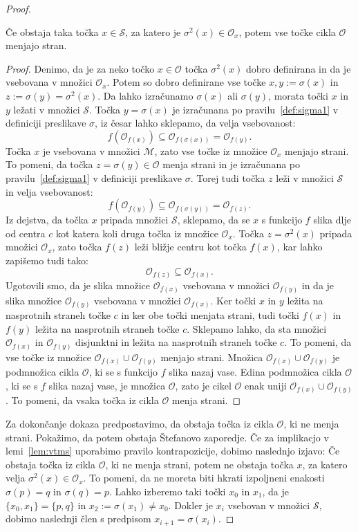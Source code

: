 \documentclass[mat2]{fmfdelo}
\begin{document}
\begin{proof}
\begin{lema}\label{lem:vtms}
Če obstaja taka točka $x \in \mathcal{S}$, za katero je $\sigma^2(x) \in \mathcal{O}_x$, potem vse točke cikla $\mathcal{O}$ menjajo stran.
\end{lema}
\begin{proof}
Denimo, da je za neko točko $x \in \mathcal{O}$ točka $\sigma^2(x)$ dobro definirana in da je vsebovana v množici $\mathcal{O}_x$. Potem so dobro definirane vse točke $x, y:=\sigma(x)$ in $z:=\sigma(y) = \sigma^2(x)$. Da lahko izračunamo $\sigma(x)$ ali $\sigma(y)$, morata točki $x$ in $y$ ležati v množici $\mathcal{S}$. Točka $y=\sigma(x)$ je izračunana po pravilu~\ref{def:sigma1} v definiciji preslikave $\sigma$, iz česar lahko sklepamo, da velja vsebovanost:
$$f(\mathcal{O}_{f(x)}) \subseteq \mathcal{O}_{f(\sigma(x))}=\mathcal{O}_{f(y)}.$$
Točka $x$ je vsebovana v množici $\mathcal{M}$, zato vse točke iz množice $\mathcal{O}_x$ menjajo strani. To pomeni, da točka $z = \sigma(y) \in \mathcal{O}$ menja strani in je izračunana po pravilu~\ref{def:sigma1} v definiciji preslikave $\sigma$. Torej tudi točka $z$ leži v množici $\mathcal{S}$ in velja vsebovanost:
$$f(\mathcal{O}_{f(y)}) \subseteq \mathcal{O}_{f(\sigma(y))}=\mathcal{O}_{f(z)}.$$
Iz dejstva, da točka $x$ pripada množici $\mathcal{S}$, sklepamo, da se $x$ s funkcijo $f$ slika dlje od centra $c$ kot katera koli druga točka iz množice $\mathcal{O}_x$. Točka $z=\sigma^2(x)$ pripada množici $\mathcal{O}_x$, zato točka $f(z)$ leži bližje centru kot točka $f(x)$, kar lahko zapišemo tudi tako:
$$\mathcal{O}_{f(z)} \subseteq \mathcal{O}_{f(x)}.$$
Ugotovili smo, da je slika množice $\mathcal{O}_{f(x)}$ vsebovana v množici $\mathcal{O}_{f(y)}$ in da je slika množice $\mathcal{O}_{f(y)}$ vsebovana v množici $\mathcal{O}_{f(x)}$. Ker točki $x$ in $y$ ležita na nasprotnih straneh točke $c$ in ker obe točki menjata strani, tudi točki $f(x)$ in $f(y)$ ležita na nasprotnih straneh točke $c$. Sklepamo lahko, da sta množici $\mathcal{O}_{f(x)}$ in $\mathcal{O}_{f(y)}$ disjunktni in ležita na nasprotnih straneh točke $c$. To pomeni, da vse točke iz množice $\mathcal{O}_{f(x)} \cup \mathcal{O}_{f(y)}$ menjajo strani. Množica $\mathcal{O}_{f(x)} \cup \mathcal{O}_{f(y)}$ je podmnožica cikla $\mathcal{O}$, ki se s funkcijo $f$ slika nazaj vase. Edina podmnožica cikla $\mathcal{O}$, ki se s $f$ slika nazaj vase, je množica $\mathcal{O}$, zato je cikel $\mathcal{O}$ enak uniji $\mathcal{O}_{f(x)} \cup \mathcal{O}_{f(y)}$. To pomeni, da vsaka točka iz cikla $\mathcal{O}$ menja strani. 
\end{proof}
Za dokončanje dokaza predpostavimo, da obstaja točka iz cikla $\mathcal{O}$, ki ne menja strani. Pokažimo, da potem obstaja Štefanovo zaporedje.
Če za implikacjo v lemi~\ref{lem:vtms} uporabimo pravilo kontrapozicije, dobimo naslednjo izjavo: Če obstaja točka iz cikla $\mathcal{O}$, ki ne menja strani, potem ne obstaja točka $x$, za katero velja $\sigma^2(x) \in \mathcal{O}_x$. To pomeni, da ne moreta biti hkrati izpoljneni enakosti $\sigma(p) = q$ in $\sigma(q) = p$. Lahko izberemo taki točki $x_0$ in $x_1$, da je $\{x_0, x_1\} = \{p, q\}$ in $x_2 := \sigma(x_1) \neq x_0$. Dokler je $x_i$ vsebovan v množici $\mathcal{S}$, dobimo naslednji člen s predpisom $x_{i+1} = \sigma(x_i)$.


\end{proof}
\end{document}
